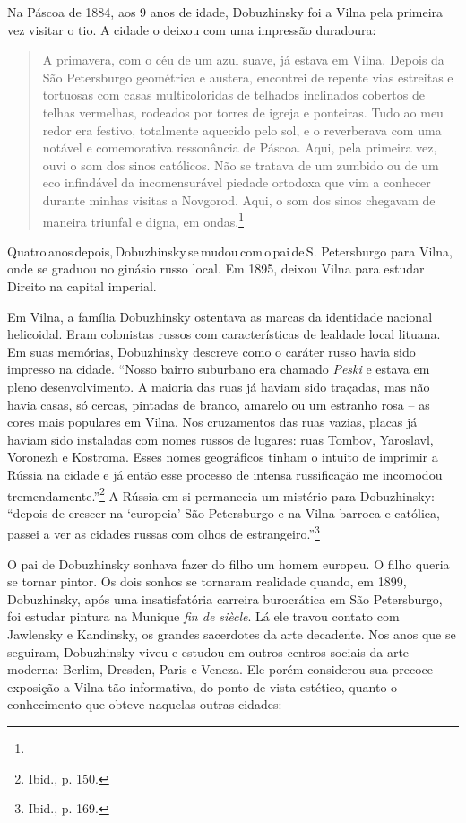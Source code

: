 Na Páscoa de 1884, aos 9 anos de idade, Dobuzhinsky foi a Vilna pela
primeira vez visitar o tio. A cidade o deixou com uma impressão
duradoura:

\begin{quote}
A primavera, com o céu de um azul suave, já estava em Vilna. Depois da
São Petersburgo geométrica e austera, encontrei de repente vias
estreitas e tortuosas com casas multicoloridas de telhados inclinados
cobertos de telhas vermelhas, rodeados por torres de igreja e ponteiras.
Tudo ao meu redor era festivo, totalmente aquecido pelo sol, e o
reverberava com uma notável e comemorativa ressonância de Páscoa. Aqui,
pela primeira vez, ouvi o som dos sinos católicos. Não se tratava de um
zumbido ou de um eco infindável da incomensurável piedade ortodoxa que
vim a conhecer durante minhas visitas a Novgorod. Aqui, o som dos sinos
chegavam de maneira triunfal e digna, em ondas.\footnote{} 
\end{quote}

Quatro\,anos\,depois,\,Dobuzhinsky\,se\,mudou\,com\,o\,pai\,de\,S. Petersburgo %
para Vilna, onde se graduou no ginásio russo local. Em 1895, deixou
Vilna para estudar Direito na capital imperial.

Em Vilna, a família Dobuzhinsky ostentava as marcas da identidade
nacional helicoidal. Eram colonistas russos com características de
lealdade local lituana. Em suas memórias, Dobuzhinsky descreve como o
caráter russo havia sido impresso na cidade. ``Nosso bairro suburbano
era chamado \textit{Peski} e estava em pleno desenvolvimento. A maioria
das ruas já haviam sido traçadas, mas não havia casas, só cercas,
pintadas de branco, amarelo ou um estranho rosa -- as cores mais
populares em Vilna. Nos cruzamentos das ruas vazias, placas já haviam
sido instaladas com nomes russos de lugares: ruas Tombov,
Yaroslavl, Voronezh e Kostroma. Esses nomes geográficos tinham o intuito
de imprimir a Rússia na cidade e já então esse processo de intensa
russificação me incomodou tremendamente.''\footnote{Ibid., p. 150.} A
Rússia em si permanecia um mistério para Dobuzhinsky: ``depois de
crescer na `europeia' São Petersburgo e na Vilna barroca e católica,
passei a ver as cidades russas com olhos de estrangeiro.''\footnote{Ibid., p. 169.}

O pai de Dobuzhinsky sonhava fazer do filho um homem europeu. O filho
queria se tornar pintor. Os dois sonhos se tornaram realidade quando, em
1899, Dobuzhinsky, após uma insatisfatória carreira burocrática em São
Petersburgo, foi estudar pintura na Munique \textit{fin de siècle}. Lá ele
travou contato com Jawlensky e Kandinsky, os grandes sacerdotes da arte
decadente. Nos anos que se seguiram, Dobuzhinsky viveu e estudou em
outros centros sociais da arte moderna: Berlim, Dresden, Paris e Veneza.
Ele porém considerou sua precoce exposição a Vilna tão informativa, do
ponto de vista estético, quanto o conhecimento que obteve naquelas
outras cidades:

